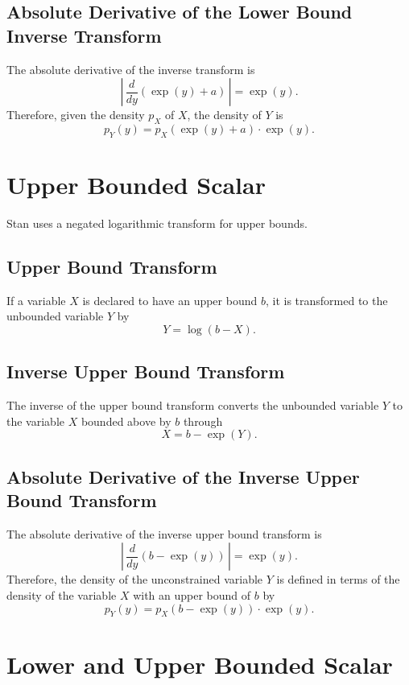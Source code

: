 \documentclass[10pt]{report}
\newcommand{\Stan}{Stan\xspace}
\begin{document}
\subsection{Absolute Derivative of the Lower Bound Inverse Transform}

The absolute derivative of the inverse transform is
\[
\left| \,
\frac{d}{dy} \left( \exp(y) + a \right)
\, \right|
= \exp(y).
\]
Therefore, given the density $p_X$ of $X$, the density of $Y$ is 
%
\[
p_Y(y) 
= p_X\!\left( \exp(y) + a \right) \cdot \exp(y).
\]


\section{Upper Bounded Scalar}

\Stan uses a negated logarithmic transform for upper bounds.

\subsection{Upper Bound Transform}

If a variable $X$ is declared to have an upper bound $b$, it is
transformed to the unbounded variable $Y$ by
%
\[
Y = \log(b - X).
\]

\subsection{Inverse Upper Bound Transform}
%
The inverse of the upper bound transform converts the unbounded
variable $Y$ to the variable $X$ bounded above by $b$ through
%
\[
X = b - \exp(Y).
\]

\subsection{Absolute Derivative of the Inverse Upper Bound Transform}

The absolute derivative of the inverse upper bound transform is 
\[
\left| \,
\frac{d}{dy} \left( b - \exp(y) \right)
\, \right|
= \exp(y).
\]
%
Therefore, the density of the unconstrained variable $Y$ is defined in
terms of the density of the variable $X$ with an upper bound of $b$ by
%
\[
p_Y(y) 
 =   p_X \!\left( b - \exp(y) \right) \cdot \exp(y).
\]


\section{Lower and Upper Bounded Scalar}
\end{document}
